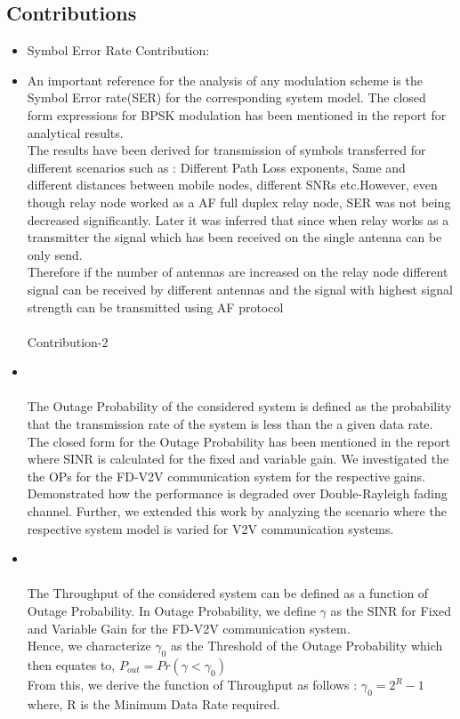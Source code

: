 \documentclass{article}
\begin{document}
\subsection{Contributions}
\begin{itemize}
Contribution-1 \\
\item   Symbol Error Rate Contribution:\\
\item An important reference for the analysis  of any modulation scheme is the Symbol Error rate(SER) for the corresponding system model. The closed form expressions for BPSK modulation has been mentioned in the report for analytical results.
\\The results have been derived for transmission of symbols transferred for different scenarios such as : Different Path Loss exponents, Same and different distances between mobile nodes, different SNRs etc.However, even though relay node worked as a AF full duplex relay node, SER was not being decreased significantly. Later it was inferred that since when relay works as a transmitter the signal which has been received on the single antenna can be only send.
\\Therefore if the number of antennas are increased on the relay node different signal can be received by different antennas and the signal with highest signal strength can be transmitted using AF protocol 
 \\\\Contribution-2 
 \item
\\\\ The Outage Probability of the considered system is defined as the probability that the transmission rate of the system is less than the a given data rate.
\\The closed form for the Outage Probability has been mentioned in the report where SINR is calculated for the fixed and variable gain. We investigated the the OPs for the FD-V2V communication system for the respective gains. Demonstrated how the performance is degraded over Double-Rayleigh fading channel. Further, we extended this work by analyzing the scenario where the respective system model is varied for V2V communication systems.
\item
\\\\ The Throughput of the considered system can be defined as a function of Outage Probability. In Outage Probability, we define $\gamma$ as the SINR for Fixed and Variable Gain for the FD-V2V communication system.
\\Hence, we characterize $\gamma_{0}$ as the Threshold of the Outage Probability which then equates to,
$P_{out} = Pr(\gamma < \gamma_{0})$
\\From this, we derive the function of Throughput as follows :
$\gamma_{0} = 2^{R} - 1$
\\where, R is the Minimum Data Rate required.


\end{itemize}
\end{document}
